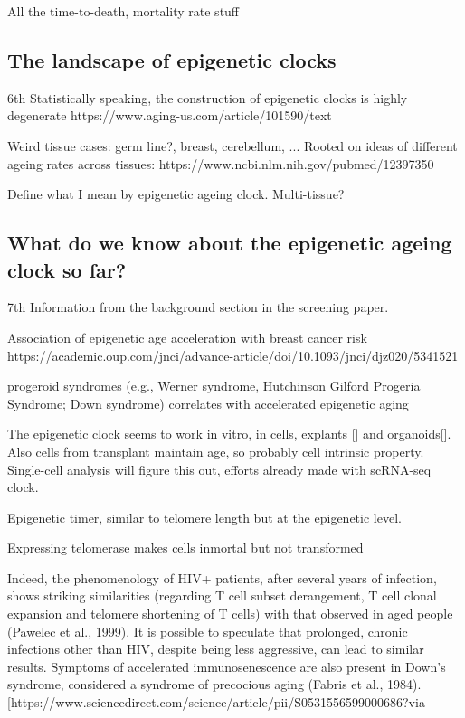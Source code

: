 All the time-to-death, mortality rate stuff


\subsection{The landscape of epigenetic clocks}

6th
Statistically speaking, the construction of epigenetic clocks is highly degenerate
https://www.aging-us.com/article/101590/text

Weird tissue cases: germ line?, breast, cerebellum, ...
Rooted on ideas of different ageing rates across tissues:
https://www.ncbi.nlm.nih.gov/pubmed/12397350

Define what I mean by epigenetic ageing clock. Multi-tissue? 


\subsection{What do we know about the epigenetic ageing clock so far?}

7th
Information from the background section in the screening paper.

Association of epigenetic age acceleration with breast cancer risk https://academic.oup.com/jnci/advance-article/doi/10.1093/jnci/djz020/5341521

progeroid syndromes (e.g., Werner syndrome, Hutchinson Gilford Progeria Syndrome; Down syndrome) correlates with accelerated epigenetic aging

The epigenetic clock seems to work in vitro, in cells, explants [] and organoids[]. Also cells from transplant maintain age, so probably cell intrinsic property. Single-cell analysis will figure this out, efforts already made with scRNA-seq clock.

Epigenetic timer, similar to telomere length but at the epigenetic level.

Expressing telomerase makes cells inmortal but not transformed 


Indeed, the phenomenology of HIV+ patients, after several years of infection, shows striking similarities (regarding T cell subset derangement, T cell clonal expansion and telomere shortening of T cells) with that observed in aged people (Pawelec et al., 1999). It is possible to speculate that prolonged, chronic infections other than HIV, despite being less aggressive, can lead to similar results. Symptoms of accelerated immunosenescence are also present in Down’s syndrome, considered a syndrome of precocious aging (Fabris et al., 1984). [https://www.sciencedirect.com/science/article/pii/S0531556599000686?via%

